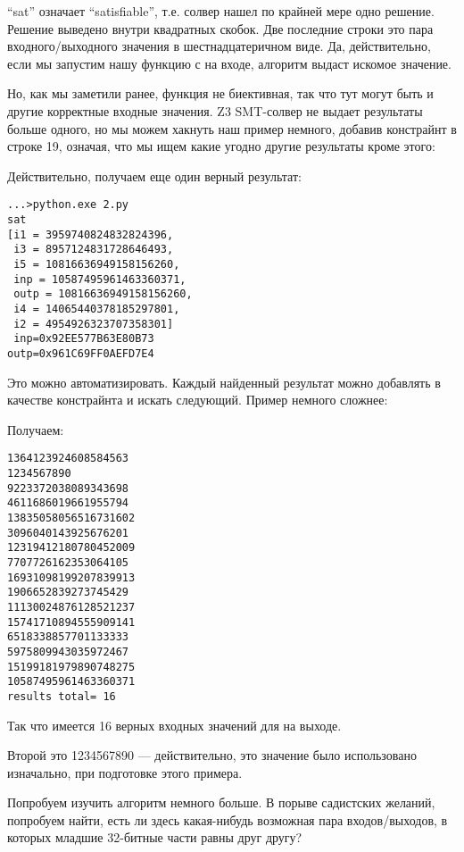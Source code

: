 ``sat'' означает ``satisfiable'', т.е. солвер нашел по крайней мере одно решение.
Решение выведено внутри квадратных скобок.
Две последние строки это пара входного/выходного значения в шестнадцатеричном виде.
Да, действительно, если мы запустим нашу функцию с
 на входе, алгоритм выдаст искомое значение.

Но, как мы заметили ранее, функция не биективная, так что тут могут быть и другие корректные входные значения.
Z3 SMT-солвер не выдает результаты больше одного, но мы можем хакнуть наш пример немного, 
добавив констрайнт в строке 19, означая, что мы ищем какие угодно другие результаты кроме этого:



Действительно, получаем еще один верный результат:

\begin{lstlisting}
...>python.exe 2.py
sat
[i1 = 3959740824832824396,
 i3 = 8957124831728646493,
 i5 = 10816636949158156260,
 inp = 10587495961463360371,
 outp = 10816636949158156260,
 i4 = 14065440378185297801,
 i2 = 4954926323707358301]
 inp=0x92EE577B63E80B73
outp=0x961C69FF0AEFD7E4
\end{lstlisting}

Это можно автоматизировать.
Каждый найденный результат можно добавлять в качестве констрайнта и искать следующий.
Пример немного сложнее:



Получаем:

\begin{lstlisting}
1364123924608584563
1234567890
9223372038089343698
4611686019661955794
13835058056516731602
3096040143925676201
12319412180780452009
7707726162353064105
16931098199207839913
1906652839273745429
11130024876128521237
15741710894555909141
6518338857701133333
5975809943035972467
15199181979890748275
10587495961463360371
results total= 16
\end{lstlisting}

Так что имеется 16 верных входных значений для  на выходе.

Второй это 1234567890 --- действительно, это значение было использовано изначально,
при подготовке этого примера.

Попробуем изучить алгоритм немного больше.
В порыве садистских желаний, попробуем найти, есть ли здесь какая-нибудь возможная пара входов/выходов,
в которых младшие 32-битные части равны друг другу?

